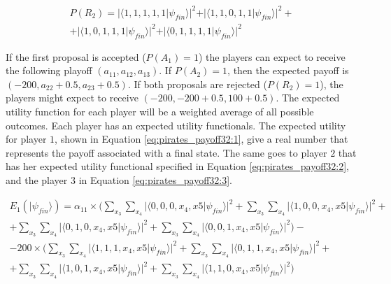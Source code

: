 \begin{equation}
\begin{split}
P(R_{2}) = \vert\langle1,1,1,1,1\vert\psi_{fin}\rangle\vert^{2} + \vert\langle1,1,0,1,1\vert\psi_{fin}\rangle\vert^{2} + \\ 
+ \vert\langle1,0,1,1,1\vert\psi_{fin}\rangle\vert^{2}
+ \vert\langle0,1,1,1,1\vert\psi_{fin}\rangle\vert^{2}
 \end{split}
\end{equation}


If the first proposal is accepted ($P(A_{1})=1$) the players can expect to receive the following playoff $(a_{11}, a_{12}, a_{13})$. If $P(A_{2})=1$, then the expected payoff is $(-200, a_{22}+0.5, a_{23}+0.5)$. If both proposals are rejected ($P(R_{2})= 1$), the players might expect to receive $(-200, -200+0.5, 100+0.5)$. The expected utility function for each player will be a weighted average of all possible outcomes. Each player has an expected utility functionals. The expected utility for player $1$, shown in Equation \ref{eq:pirates_payoff32:1}, give a real number that represents the payoff associated with a final state. The same goes to player $2$ that has her expected utility functional specified in Equation \ref{eq:pirates_payoff32:2}, and the player $3$ in Equation \ref{eq:pirates_payoff32:3}.

 
\begin{equation}
\begin{split}
E_{1}(\vert\psi_{fin}\rangle)=\alpha_{11}\times(\sum_{x_{3}}\sum_{x_{4}}\vert\langle0,0,0,x_{4},x{5}\vert\psi_{fin}\rangle\vert^{2} + \sum_{x_{3}}\sum_{x_{4}}\vert\langle1,0,0,x_{4},x{5}\vert\psi_{fin}\rangle\vert^{2} + \\ 
+ \sum_{x_{3}}\sum_{x_{4}}\vert\langle0,1,0,x_{4},x{5}\vert\psi_{fin}\rangle\vert^{2}
+ \sum_{x_{3}}\sum_{x_{4}}\vert\langle0,0,1,x_{4},x{5}\vert\psi_{fin}\rangle\vert^{2}
 ) - \\ 
 - 200\times(\sum_{x_{3}}\sum_{x_{4}}\vert\langle1,1,1,x_{4},x{5}\vert\psi_{fin}\rangle\vert^{2} + \sum_{x_{3}}\sum_{x_{4}}\vert\langle0,1,1,x_{4},x{5}\vert\psi_{fin}\rangle\vert^{2} + \\ 
+ \sum_{x_{3}}\sum_{x_{4}}\vert\langle1,0,1,x_{4},x{5}\vert\psi_{fin}\rangle\vert^{2}
+ \sum_{x_{3}}\sum_{x_{4}}\vert\langle1,1,0,x_{4},x{5}\vert\psi_{fin}\rangle\vert^{2}
 ) 
\end{split}
\label{eq:pirates_payoff32:1}
\end{equation}

